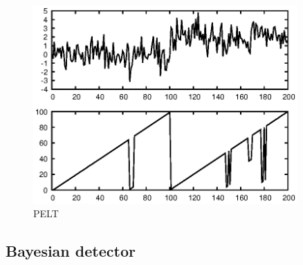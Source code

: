 \documentclass[doctoral,utf8,lot,loar,lof,shortloft,index]{jydiss}
\begin{document}

\begin{figure}[!htb]
	\centering
	\includegraphics[width=0.9\textwidth]{images/example_output_pelt.eps}
	\caption{PELT}\label{fig:pelt_output_example}
\end{figure}

\subsection{Bayesian detector}
\end{document}
